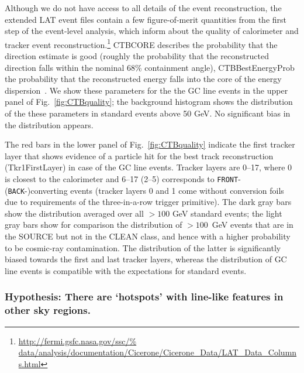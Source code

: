\documentclass[aps,twocolumn,prd,superscriptaddress,showpacs,nofootinbib,fixfloat]{revtex4}
\begin{document}
Although we do not have access to all details of the event reconstruction, the
extended LAT event files contain a few figure-of-merit quantities from the first step of the
event-level analysis, which inform about the quality of
calorimeter and tracker event reconstruction.\footnote{\url{http://fermi.gsfc.nasa.gov/ssc/%
data/analysis/documentation/Cicerone/Cicerone\_Data/LAT\_Data\_Columns.html}}
CTBCORE describes the probability that the direction estimate
is good (roughly the probability that the reconstructed
direction falls within the nominal 68\% containment angle),
CTBBestEnergyProb the probability that the reconstructed
energy falls into the core of the energy
dispersion~\cite{collaboration:2012kca}. We show
these parameters for the the GC line events in the upper
panel of Fig.~\ref{fig:CTBquality}; the background histogram
shows the distribution of the these parameters in standard
events above 50 GeV. No significant bias in the distribution
appears.

The red bars in the lower panel of
Fig.~\ref{fig:CTBquality} indicate the first tracker layer that
shows evidence of a particle hit for the best track
reconstruction (Tkr1FirstLayer) in case of the GC line
events.  Tracker layers are 0--17, where 0 is closest to the
calorimeter and 6--17 (2--5) corresponds to \texttt{FRONT}-
(\texttt{BACK}-)converting events (tracker layers 0 and 1 come
without conversion foils due to requirements of the three-in-a-row trigger
primitive). The dark gray bars show the
distribution averaged over all $>100$ GeV standard events;
the light gray bars
show for comparison the distribution of $>100$~GeV events that are in the SOURCE
but not in the CLEAN class, and hence with a higher
probability to be cosmic-ray contamination. The distribution of the latter is significantly biased
towards the first and last tracker layers, whereas
the distribution of GC line events is compatible with the
expectations for standard events.

\subsubsection{Hypothesis: There are `hotspots' with
line-like features in other sky regions.}
\end{document}
